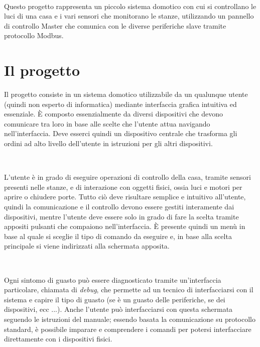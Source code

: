 \documentclass[a4paper,titlepage]{book}
\begin{document}
~

Questo progetto rappresenta un piccolo sistema domotico con cui si controllano le luci di una casa e i vari sensori che monitorano le stanze, utilizzando un pannello di controllo Master che comunica con le diverse periferiche slave tramite protocollo Modbus.


\tableofcontents




\chapter{Il progetto}

Il progetto consiste in un sistema domotico utilizzabile da un qualunque utente (quindi non esperto di informatica) mediante interfaccia grafica intuitiva ed essenziale. È composto essenzialmente da diversi dispositivi che devono comunicare tra loro in base alle scelte che l'utente attua navigando nell'interfaccia. Deve esserci quindi un dispositivo centrale che trasforma gli ordini ad alto livello dell'utente in istruzioni per gli altri dispositivi.

~

L'utente è in grado di eseguire operazioni di controllo della casa, tramite sensori presenti nelle stanze, e di interazione con oggetti fisici, ossia luci e motori per aprire o chiudere porte. Tutto ciò deve risultare semplice e intuitivo all'utente, quindi la comunicazione e il controllo devono essere gestiti interamente dai dispositivi, mentre l'utente deve essere solo in grado di fare la scelta tramite appositi pulsanti che compaiono nell'interfaccia. È presente quindi un menù in base al quale si sceglie il tipo di comando da eseguire e, in base alla scelta principale si viene indirizzati alla schermata apposita.

~

Ogni sintomo di guasto può essere diagnosticato tramite un'interfaccia particolare, chiamata di \textit{debug}, che permette ad un tecnico di interfacciarsi con il sistema e capire il tipo di guasto (se è un guasto delle periferiche, se dei dispositivi, ecc ...). Anche l'utente può interfacciarsi con questa schermata seguendo le istruzioni del manuale; essendo basata la comunicazione su protocollo standard, è possibile imparare e comprendere i comandi per potersi interfacciare direttamente con i dispositivi fisici.  
\end{document}
